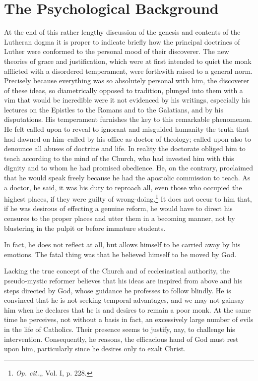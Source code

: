 \section{The Psychological Background}

At the end of this rather lengthy discussion of the genesis and
contents of the Lutheran dogma it is proper to indicate briefly how
the principal doctrines of Luther were conformed to the personal
mood of their discoverer. The new theories of grace and justification,
which were at first intended to quiet the monk afflicted
with a disordered temperament, were forthwith raised to a general
norm. Precisely because everything was so absolutely personal with
him, the discoverer of these ideas, so diametrically opposed to tradition,
plunged into them with a vim that would be incredible were
it not evidenced by his writings, especially his lectures on the
Epistles to the Romans and to the Galatians, and by his disputations. His
temperament furnishes the key to this remarkable phenomenon. He felt called
upon to reveal to ignorant and misguided
humanity the truth that had dawned on him--called by his office as
doctor of theology; called upon also to denounce all abuses of doctrine
and life. In reality the doctorate obliged him to teach according
to the mind of the Church, who had invested him with this dignity
and to whom he had promised obedience. He, on the contrary, proclaimed
that he would speak freely because he had the apostolic
commission to teach. As a doctor, he said, it was his duty to reproach
all, even those who occupied the highest places, if they were
guilty of wrong-doing.\footnote{\textit{Op. cit.},, Vol. I, p. 228.}
It does not occur to him that, if he was
desirous of effecting a genuine reform, he would have to direct his
censures to the proper places and utter them in a becoming manner,
not by blustering in the pulpit or before immature students.

In fact, he does not reflect at all, but allows himself to be carried
away by his emotions. The fatal thing was that he believed himself to be moved by God.

Lacking the true concept of the Church and of ecclesiastical authority,
the pseudo-mystic reformer believes that his ideas are inspired
from above and his steps directed by God, whose guidance
he professes to follow blindly. He is convinced that he is not seeking
temporal advantages, and we may not gainsay him when he
declares that he is and desires to remain a poor monk. At the same
time he perceives, not without a basis in fact, an excessively large
number of evils in the life of Catholics. Their presence seems
to justify, nay, to challenge his intervention. Consequently, he reasons,
the efficacious hand of God must rest upon him, particularly
since he desires only to exalt Christ.

